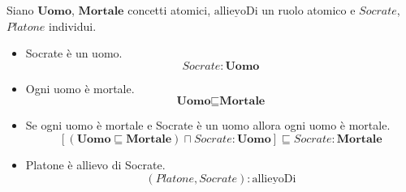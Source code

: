 \documentclass{article}
\begin{document}
Siano $ \textbf{Uomo} $, $ \textbf{Mortale} $ concetti atomici, $ \underline{\textrm{allievoDi}} $ un ruolo atomico e $ Socrate $, $ Platone $ individui. 
\begin{itemize}
    \item Socrate è un uomo. 
    \begin{equation*}
         Socrate:\textbf{Uomo}
    \end{equation*}
    \item Ogni uomo è mortale.
    \begin{equation*}
        \textbf{Uomo} \sqsubseteq \textbf{Mortale}
    \end{equation*}
    \item Se ogni uomo è mortale e Socrate è un uomo allora ogni uomo è mortale.
    \begin{equation}
        \label{eq:subsumption}
        [(\textbf{Uomo} \sqsubseteq \textbf{Mortale}) \sqcap Socrate:\textbf{Uomo}] \sqsubseteq Socrate:\textbf{Mortale}
    \end{equation}
    \item Platone è allievo di Socrate.
    \begin{equation*}
        (Platone, Socrate):\underline{\textrm{allievoDi}}
    \end{equation*}
\end{itemize}
\end{document}
